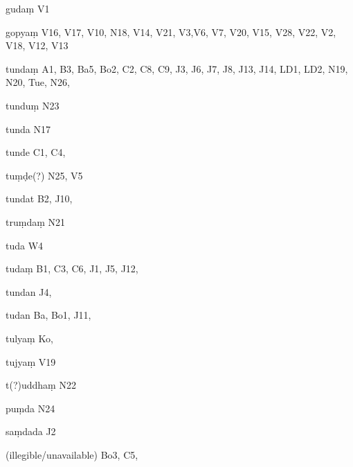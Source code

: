 \begin{ekdosis}
\begin{marma}[hp01_055]
\begin{marma}[hp02_009]
\begin{marma}[hp02_011]
      \begin{marma}[hp02_34b]
      \item[gudaṃ] V1
      \item[gopyaṃ] V16, V17, V10, N18, V14, V21, V3,V6, V7, V20, V15, V28, V22, V2, V18, V12, V13
      \item[tundaṃ] A1, B3, Ba5, Bo2, C2, C8, C9, J3, J6, J7, J8, J13, J14, LD1, LD2, N19, N20, Tue, N26, 
      \item[tunduṃ] N23
      \item[tunda] N17
      \item[tunde] C1, C4,  
      \item[tuṃḍe(?)] N25, V5
      \item[tundat] B2, J10,
      \item[truṃdaṃ] N21
      \item[tuda] W4
      \item[tudaṃ] B1, C3, C6, J1, J5, J12,  
      \item[tundan] J4,
      \item[tudan] Ba, Bo1, J11, 
      \item[tulyaṃ] Ko,
      \item[tujyaṃ] V19
      \item[t(?)uddhaṃ] N22
      \item[puṃda] N24
      \item[saṃdada] J2
      \item[(illegible/unavailable)] Bo3, C5,
        \begin{description}

        \end{description}
      \end{marma}


\end{marma}
\end{marma}
\end{marma}
\end{ekdosis}
